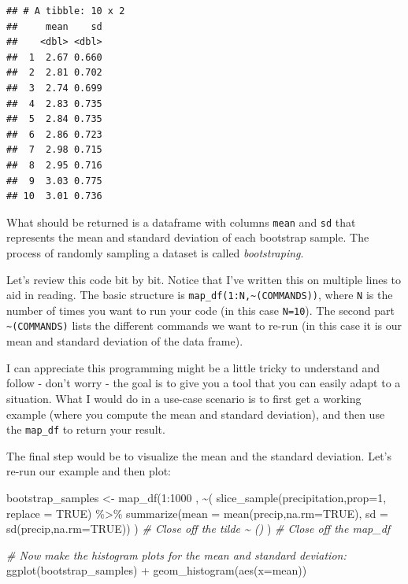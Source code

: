 \documentclass[
]{book}
\newenvironment{Shaded}{\begin{snugshade}}{\end{snugshade}}
\newcommand{\AttributeTok}[1]{\textcolor[rgb]{0.77,0.63,0.00}{#1}}
\newcommand{\CommentTok}[1]{\textcolor[rgb]{0.56,0.35,0.01}{\textit{#1}}}
\newcommand{\ConstantTok}[1]{\textcolor[rgb]{0.00,0.00,0.00}{#1}}
\newcommand{\DecValTok}[1]{\textcolor[rgb]{0.00,0.00,0.81}{#1}}
\newcommand{\FunctionTok}[1]{\textcolor[rgb]{0.00,0.00,0.00}{#1}}
\newcommand{\NormalTok}[1]{#1}
\newcommand{\OtherTok}[1]{\textcolor[rgb]{0.56,0.35,0.01}{#1}}
\newcommand{\SpecialCharTok}[1]{\textcolor[rgb]{0.00,0.00,0.00}{#1}}
\theoremstyle{definition}
\theoremstyle{definition}
\theoremstyle{definition}
\theoremstyle{remark}
\begin{document}
\begin{verbatim}
## # A tibble: 10 x 2
##     mean    sd
##    <dbl> <dbl>
##  1  2.67 0.660
##  2  2.81 0.702
##  3  2.74 0.699
##  4  2.83 0.735
##  5  2.84 0.735
##  6  2.86 0.723
##  7  2.98 0.715
##  8  2.95 0.716
##  9  3.03 0.775
## 10  3.01 0.736
\end{verbatim}

What should be returned is a dataframe with columns \texttt{mean} and \texttt{sd} that represents the mean and standard deviation of each bootstrap sample. The process of randomly sampling a dataset is called \emph{bootstraping}.

Let's review this code bit by bit. Notice that I've written this on multiple lines to aid in reading. The basic structure is \texttt{map\_df(1:N,\textasciitilde{}(COMMANDS))}, where \texttt{N} is the number of times you want to run your code (in this case \texttt{N=10}). The second part \texttt{\textasciitilde{}(COMMANDS)} lists the different commands we want to re-run (in this case it is our mean and standard deviation of the data frame).

I can appreciate this programming might be a little tricky to understand and follow - don't worry - the goal is to give you a tool that you can easily adapt to a situation. What I would do in a use-case scenario is to first get a working example (where you compute the mean and standard deviation), and then use the \texttt{map\_df} to return your result.

The final step would be to visualize the mean and the standard deviation. Let's re-run our example and then plot:

\begin{Shaded}
\begin{Highlighting}[]
\NormalTok{bootstrap\_samples }\OtherTok{\textless{}{-}} \FunctionTok{map\_df}\NormalTok{(}\DecValTok{1}\SpecialCharTok{:}\DecValTok{1000}\NormalTok{ ,}
        \SpecialCharTok{\textasciitilde{}}\NormalTok{(}
          \FunctionTok{slice\_sample}\NormalTok{(precipitation,}\AttributeTok{prop=}\DecValTok{1}\NormalTok{, }\AttributeTok{replace =} \ConstantTok{TRUE}\NormalTok{) }\SpecialCharTok{\%\textgreater{}\%}
                    \FunctionTok{summarize}\NormalTok{(}\AttributeTok{mean =} \FunctionTok{mean}\NormalTok{(precip,}\AttributeTok{na.rm=}\ConstantTok{TRUE}\NormalTok{),}
                              \AttributeTok{sd =} \FunctionTok{sd}\NormalTok{(precip,}\AttributeTok{na.rm=}\ConstantTok{TRUE}\NormalTok{)) }
\NormalTok{          )  }\CommentTok{\# Close off the tilde \textasciitilde{} ()}
\NormalTok{        )  }\CommentTok{\# Close off the map\_df}

\CommentTok{\# Now make the histogram plots for the mean and standard deviation:}
  \FunctionTok{ggplot}\NormalTok{(bootstrap\_samples) }\SpecialCharTok{+}
    \FunctionTok{geom\_histogram}\NormalTok{(}\FunctionTok{aes}\NormalTok{(}\AttributeTok{x=}\NormalTok{mean))}
\end{Highlighting}
\end{Shaded}
\end{document}
